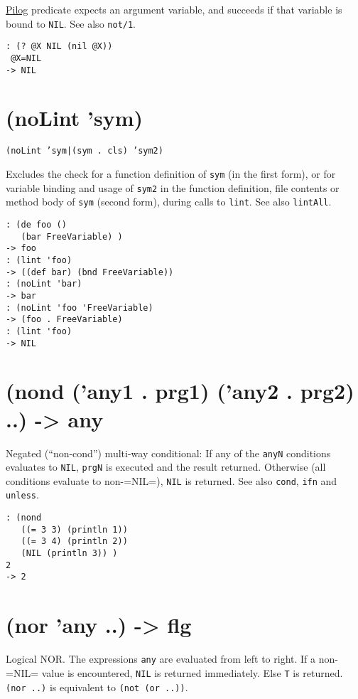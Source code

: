 {{{{{{{\hyperref[ref.html-pilog]{Pilog} predicate expects an argument variable, and
succeeds if that variable is bound to \texttt{NIL}. See also \texttt{not/1}.


\begin{verbatim}
: (? @X NIL (nil @X))
 @X=NIL
-> NIL
\end{verbatim}

 
\section{(noLint 'sym)}
\label{sec-8-1-14-15}


\texttt{(noLint 'sym|(sym . cls) 'sym2)}

Excludes the check for a function definition of \texttt{sym} (in the first
form), or for variable binding and usage of \texttt{sym2} in the function
definition, file contents or method body of \texttt{sym} (second form), during
calls to \texttt{lint}. See also \texttt{lintAll}.


\begin{verbatim}
: (de foo ()
   (bar FreeVariable) )
-> foo
: (lint 'foo)
-> ((def bar) (bnd FreeVariable))
: (noLint 'bar)
-> bar
: (noLint 'foo 'FreeVariable)
-> (foo . FreeVariable)
: (lint 'foo)
-> NIL
\end{verbatim}

 
\section{(nond ('any1 . prg1) ('any2 . prg2) ..) -> any}
\label{sec-8-1-14-16}


Negated (``non-cond'') multi-way conditional: If any of the \texttt{anyN}
conditions evaluates to \texttt{NIL}, \texttt{prgN} is executed and the result
returned. Otherwise (all conditions evaluate to non-=NIL=), \texttt{NIL} is
returned. See also \texttt{cond}, \texttt{ifn} and \texttt{unless}.


\begin{verbatim}
: (nond
   ((= 3 3) (println 1))
   ((= 3 4) (println 2))
   (NIL (println 3)) )
2
-> 2
\end{verbatim}

 
\section{(nor 'any ..) -> flg}
\label{sec-8-1-14-17}


Logical NOR. The expressions \texttt{any} are evaluated from left to right. If
a non-=NIL= value is encountered, \texttt{NIL} is returned immediately. Else
\texttt{T} is returned. \texttt{(nor ..)} is equivalent to \texttt{(not (or ..))}.


}}}}}}}
